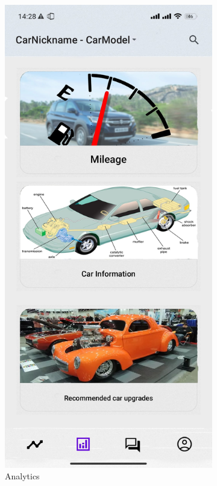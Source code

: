 \documentclass[11pt]{scrartcl} %
\begin{document}
\begin{figure}[!htb]
\begin{subfigure}{.5\textwidth}
  \centering
  \includegraphics[width=.6\linewidth]{assets/analytics_mock_up.jpg}
  \caption{Analytics}
  \label{fig:sfig2}
\end{subfigure}
\label{fig:fig}
\par\bigskip %
\begin{subfigure}{.5\textwidth}
  \centering

\end{subfigure}
\end{figure}
\end{document}
